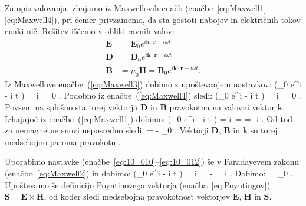 Za opis valovanja izhajamo iz Maxwellovih enačb (enačbe~\ref{eq:Maxwell1}--\ref{eq:Maxwell4}), 
pri čemer privzamemo, da sta gostoti nabojev in električnih tokov enaki nič. 
Rešitev iščemo v obliki ravnih valov:
\begin{align}
 \mathbf{E} &= \mathbf{E}_0 e^{i\mathbf{k}\cdot \mathbf{r} - i \omega t} \label{eq:10_010} \\
 \mathbf{D} &= \mathbf{D}_0 e^{i\mathbf{k}\cdot \mathbf{r} - i \omega t} \label{eq:10_011}\\
 \mathbf{B} &= \mu_0 \mathbf{H} = \mathbf{B}_0 e^{i\mathbf{k}\cdot \mathbf{r} - i \omega t}.
 \label{eq:10_012}
\end{align}
Iz Maxwellove enačbe~(\ref{eq:Maxwell3}) dobimo z upoštevanjem nastavkov:
\beq
\nabla \cdot \left(_0 e^{i\cdot {} - i \omega t} \right) = 
i\,\cdot {} = 0 \qquad \Longrightarrow \qquad {} \perp {}.
\label{eq:10_013}
\eeq
Podobno iz enačbe~(\ref{eq:Maxwell4}) sledi:
\beq
\nabla \cdot \left(_0 e^{i\cdot {} - i \omega t} \right) = 
i\,\cdot {} = 0 \qquad \Longrightarrow \qquad {} \perp {}.
\label{eq:10_014}
\eeq
Povsem na splošno sta torej vektorja $\mathbf{D}$ in $\mathbf{B}$ pravokotna na valovni vektor $\mathbf{k}$.
Izhajajoč iz enačbe~(\ref{eq:Maxwell1}) dobimo:
\beq
\nabla \times \left(_0 e^{i\cdot {} - i \omega t} \right) = 
i\,\times {} =  = -i \omega {}.
\label{eq:10_015}
\eeq
Od tod za nemagnetne snovi neposredno sledi:
\beq
{}\times {} = - \mu_0 \omega {} \qquad \Longrightarrow \qquad {} \perp {}.
\label{eq:10_016}
\eeq
Vektorji $\mathbf{D}$, $\mathbf{B}$ in $\mathbf{k}$ so torej medsebojno paroma pravokotni.

Uporabimo nastavke (enačbe~\ref{eq:10_010}--\ref{eq:10_012})
še v Faradayevem zakonu (enačbo~\ref{eq:Maxwell2}) in dobimo:
\beq
\nabla \times \left(_0 e^{i\cdot {} - i \omega t} \right) = 
i\,\times {} = -  = i \omega {}.
\label{eq:10_017}
\eeq
Dobimo:
\beq
{}\times {} = \omega \mu_0  \qquad \Longrightarrow 
\qquad {} \perp {}.
\label{eq:10_018}
\eeq
Upoštevamo še definicijo Poyntinovega vektorja 
(enačba~\ref{eq:Poyntingov}) $\mathbf{S} = \mathbf{E} \times \mathbf{H}$, od koder
sledi medsebojna pravokotnost vektorjev $\mathbf{E}$, $\mathbf{H}$ in $\mathbf{S}$.

